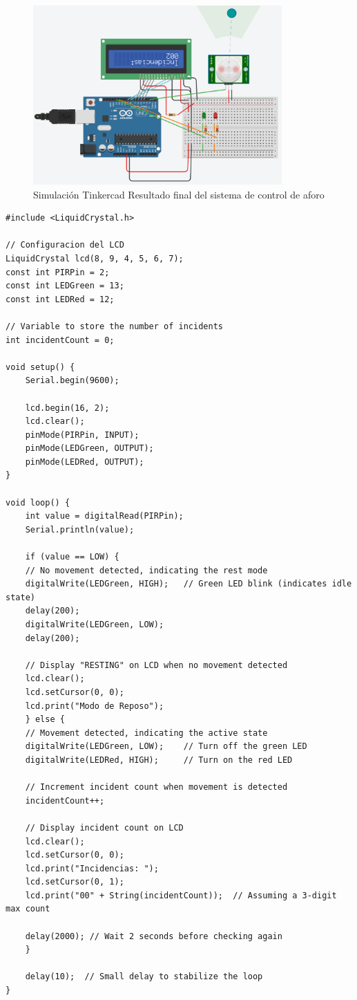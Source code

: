 \documentclass{article}
\begin{document}
\begin{figure}[H]
    \centering
    \includegraphics[width=0.85\textwidth]{./img/ckpt_9.png}
    \caption{Simulación Tinkercad Resultado final del sistema de control de aforo}
    \label{fig:control_aforo}
\end{figure}

\begin{lstlisting}[style=cppstyle, caption={Código en C++ para el sistema de control de aforo.}, label={code:sensor_ambiental}]
#include <LiquidCrystal.h>

// Configuracion del LCD
LiquidCrystal lcd(8, 9, 4, 5, 6, 7);
const int PIRPin = 2;
const int LEDGreen = 13;
const int LEDRed = 12;

// Variable to store the number of incidents
int incidentCount = 0;

void setup() {
    Serial.begin(9600);
    
    lcd.begin(16, 2);
    lcd.clear();
    pinMode(PIRPin, INPUT);
    pinMode(LEDGreen, OUTPUT);
    pinMode(LEDRed, OUTPUT);
}

void loop() {
    int value = digitalRead(PIRPin);
    Serial.println(value);

    if (value == LOW) {
    // No movement detected, indicating the rest mode
    digitalWrite(LEDGreen, HIGH);   // Green LED blink (indicates idle state)
    delay(200);
    digitalWrite(LEDGreen, LOW);
    delay(200);
    
    // Display "RESTING" on LCD when no movement detected
    lcd.clear();
    lcd.setCursor(0, 0);
    lcd.print("Modo de Reposo");
    } else {
    // Movement detected, indicating the active state
    digitalWrite(LEDGreen, LOW);    // Turn off the green LED
    digitalWrite(LEDRed, HIGH);     // Turn on the red LED

    // Increment incident count when movement is detected
    incidentCount++;

    // Display incident count on LCD
    lcd.clear();
    lcd.setCursor(0, 0);
    lcd.print("Incidencias: ");
    lcd.setCursor(0, 1);
    lcd.print("00" + String(incidentCount));  // Assuming a 3-digit max count
    
    delay(2000); // Wait 2 seconds before checking again
    }
    
    delay(10);  // Small delay to stabilize the loop
}    
\end{lstlisting}
    
\end{document}
